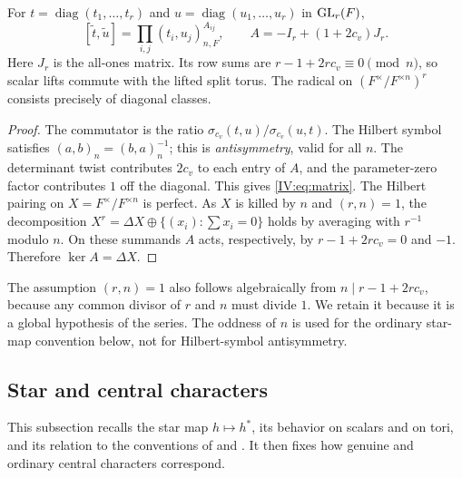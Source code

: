 \begin{proposition}\label{IV:prop:diag}
For $t=\operatorname{diag}(t_1,\ldots,t_r)$ and
$u=\operatorname{diag}(u_1,\ldots,u_r)$ in $\operatorname{GL}_r(F)$,
\begin{equation}\label{IV:eq:matrix}
 [\widetilde t,\widetilde u]
 =\prod_{i,j}(t_i,u_j)_{n,F}^{A_{ij}},\qquad
 A=-I_r+(1+2c_v)J_r.
\end{equation}
Here $J_r$ is the all-ones matrix.  Its row sums are
$r-1+2rc_v\equiv0\pmod n$, so scalar lifts commute with the lifted
split torus.  The radical on $(F^\times/F^{\times n})^r$ consists
precisely of diagonal classes.
\end{proposition}
\begin{proof}
The commutator is the ratio
$\sigma_{c_v}(t,u)/\sigma_{c_v}(u,t)$.
The Hilbert symbol satisfies $(a,b)_n=(b,a)_n^{-1}$; this is
\emph{antisymmetry}, valid for all $n$.  The determinant twist
contributes $2c_v$ to each entry of $A$, and the parameter-zero
factor contributes $1$ off the diagonal.  This gives \eqref{IV:eq:matrix}.
The Hilbert pairing on $X=F^\times/F^{\times n}$ is perfect.
As $X$ is killed by $n$ and $(r,n)=1$, the decomposition
$X^r=\Delta X\oplus\{(x_i):\sum x_i=0\}$ holds by averaging with
$r^{-1}$ modulo $n$.  On these summands $A$ acts, respectively, by
$r-1+2rc_v=0$ and $-1$.  Therefore $\ker A=\Delta X$.
\end{proof}

\begin{remark}
The assumption $(r,n)=1$ also follows algebraically from
$n\mid r-1+2rc_v$, because any common divisor of $r$ and $n$ must
divide $1$.  We retain it because it is a global hypothesis of the
series.  The oddness of $n$ is used for the ordinary star-map
convention below, not for Hilbert-symbol antisymmetry.
\end{remark}

\subsection{Star and central characters}\label{IV:subsec:star}
This subsection recalls the star map $h\mapsto h^*$, its behavior on scalars and on tori, and its relation to the conventions of \cite{FK86} and \cite{Zo23}. It then fixes how genuine and ordinary central characters correspond.

